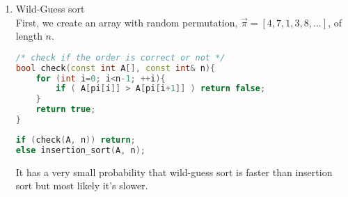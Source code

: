 \documentclass[11pt]{article}
\begin{document}
\begin{enumerate}
\begin{enumerate}
\begin{enumerate}
\item Wild-Guess sort\\
First, we create an array with random permutation, $\vec{\pi}= [4, 7, 1, 3, 8, ...]$, of length $n$.
\begin{lstlisting}[language=C++]
/* check if the order is correct or not */
bool check(const int A[], const int& n){
	for (int i=0; i<n-1; ++i){
		if ( A[pi[i]] > A[pi[i+1]] ) return false;
	}
	return true;
}
\end{lstlisting}
\begin{lstlisting}[language=C++]
if (check(A, n)) return;
else insertion_sort(A, n);
\end{lstlisting}
It has a very small probability that wild-guess sort is faster than insertion sort but most likely it's slower.
\end{enumerate}
\end{enumerate}
\end{enumerate}
\end{document}

